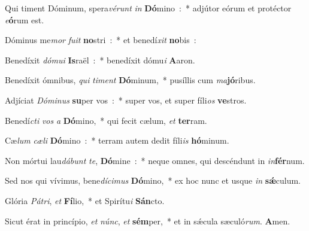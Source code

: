 \item Qui timent Dóminum, spera\emph{vé}\emph{runt} \emph{in} \textbf{Dó}mino~:~* adjútor eórum et protéctor \emph{e}\textbf{ó}rum est.
\item Dóminus me\emph{mor} \emph{fu}\emph{it} \textbf{no}stri~:~* et benedí\emph{xit} \textbf{no}bis~:
\item Benedíxit \emph{dó}\emph{mu}\emph{i} \textbf{Is}raël~:~* benedíxit dómu\emph{i} \textbf{A}aron.
\item Benedíxit ómnibus, \emph{qui} \emph{ti}\emph{ment} \textbf{Dó}minum,~* pusíllis cum \emph{ma}\textbf{jó}ribus.
\item Adjíciat \emph{Dó}\emph{mi}\emph{nus} \textbf{su}per vos~:~* super vos, et super fíli\emph{os} \textbf{ve}stros.
\item Benedí\emph{cti} \emph{vos} \emph{a} \textbf{Dó}mino,~* qui fecit cælum, \emph{et} \textbf{ter}ram.
\item Cæ\emph{lum} \emph{cæ}\emph{li} \textbf{Dó}mino~:~* terram autem dedit fíli\emph{is} \textbf{hó}\-mi\-num.
\item Non mórtui lau\emph{dá}\emph{bunt} \emph{te}, \textbf{Dó}mine~:~* neque omnes, qui descéndunt in \emph{in}\textbf{fér}num.
\item Sed nos qui vívimus, bene\emph{dí}\emph{ci}\emph{mus} \textbf{Dó}mino,~* ex hoc nunc et usque \emph{in} \textbf{sǽ}culum.
\item Glória \emph{Pá}\emph{tri}, \emph{et} \textbf{Fí}lio,~* et Spirítu\emph{i} \textbf{Sán}cto.
\item Sicut érat in princípio, \emph{et} \emph{núnc}, \emph{et} \textbf{sém}per,~* et in sǽcula sæculó\emph{rum}. \textbf{A}men.